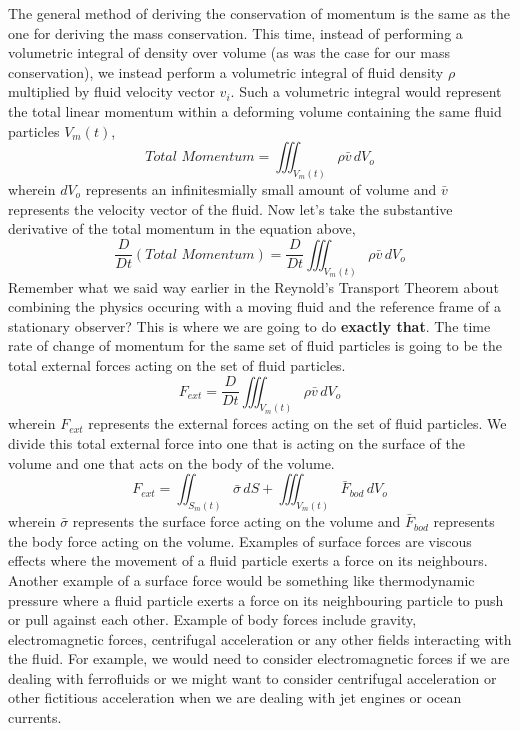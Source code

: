 
The general method of deriving the conservation of momentum is the same as the one for deriving the mass conservation.
This time, instead of performing a volumetric integral of density over volume (as was the case for our mass conservation), we instead perform a volumetric integral of fluid density $\rho$ multiplied by fluid velocity vector $v_{i}$.
Such a volumetric integral would represent the total linear momentum within a deforming volume containing the same fluid particles $V_{m}(t)$,
$$ Total \,\,Momentum = \iiint^{}_{V_{m}(t)} \rho \bar{v} \,dV_{o}$$
wherein  $dV_{o}$ represents an infinitesmially small amount of volume and $\bar{v}$ represents the velocity vector of the fluid.
Now let's take the substantive derivative of the total momentum in the equation above,
$$\frac{D}{Dt}(Total \,\,Momentum) = \frac{D}{Dt}\iiint^{}_{V_{m}(t)} \rho \bar{v} \,dV_{o}$$
Remember what we said way earlier in the Reynold's Transport Theorem about combining the physics occuring with a moving fluid and the reference frame of a stationary observer?
This is where we are going to do \textbf{exactly that}. 
The time rate of change of momentum for the same set of fluid particles is going to be the total external forces acting on the set of fluid particles.
\begin{equation}F_{ext} = \frac{D}{Dt}\iiint^{}_{V_{m}(t)} \rho \bar{v} \,dV_{o} \label{F External Momentum Equation LHS}\end{equation}
wherein $F_{ext}$ represents the external forces acting on the set of fluid particles.
We divide this total external force into one that is acting on the surface of the volume and one that acts on the body of the volume.
\begin{equation}F_{ext} = \iint^{}_{S_{m}(t)} \bar{\sigma} \,dS + \iiint^{}_{V_{m}(t)} \bar{F}_{bod} \,dV_{o} \label{F External Momentum Equation RHS}\end{equation}
wherein $\bar{\sigma}$ represents the surface force acting on the volume and $\bar{F}_{bod}$ represents the body force acting on the volume.
Examples of surface forces are viscous effects where the movement of a fluid particle exerts a force on its neighbours. 
Another example of a surface force would be something like thermodynamic pressure where a fluid particle exerts a force on its neighbouring particle to push or pull against each other.
Example of body forces include gravity, electromagnetic forces, centrifugal acceleration or any other fields interacting with the fluid.
For example, we would need to consider electromagnetic forces if we are dealing with ferrofluids or we might want to consider centrifugal acceleration or other fictitious acceleration when we are dealing with jet engines or ocean currents.
